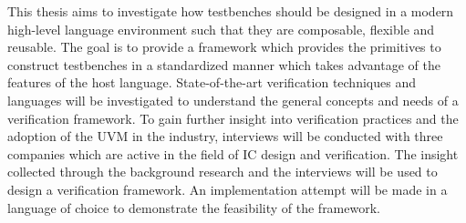 This thesis aims to investigate how testbenches should be designed in a modern high-level language environment such
that they are composable, flexible and reusable. The goal is to provide a framework which provides the primitives to
construct testbenches in a standardized manner which takes advantage of the features of the host language.
State-of-the-art verification techniques and languages will be investigated to understand the general concepts and
needs of a verification framework. To gain further insight into verification practices and the adoption of the UVM in
the industry, interviews will be conducted with three companies which are active in the field of IC design and
verification. The insight collected through the background research and the interviews will be used to design a
verification framework. An implementation attempt will be made in a language of choice to demonstrate the feasibility
of the framework.



